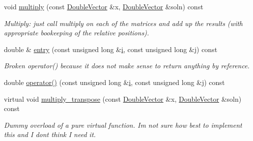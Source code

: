 \begin{DoxyCompactItemize}
void \hyperlink{classoomph_1_1SumOfMatrices_ae6c97ff92220835df3c3eeb1b0a85cc5}{multiply} (const \hyperlink{classoomph_1_1DoubleVector}{Double\+Vector} \&x, \hyperlink{classoomph_1_1DoubleVector}{Double\+Vector} \&soln) const
\begin{DoxyCompactList}\small\item\em Multiply\+: just call multiply on each of the matrices and add up the results (with appropriate bookeeping of the relative positions). \end{DoxyCompactList}\item 
double \& \hyperlink{classoomph_1_1SumOfMatrices_a848fff3077a0074c5cd33cc75913fbbd}{entry} (const unsigned long \&\hyperlink{cfortran_8h_adb50e893b86b3e55e751a42eab3cba82}{i}, const unsigned long \&j) const
\begin{DoxyCompactList}\small\item\em Broken operator() because it does not make sense to return anything by reference. \end{DoxyCompactList}\item 
double \hyperlink{classoomph_1_1SumOfMatrices_a934664ec676d36115ef27a9758827f7c}{operator()} (const unsigned long \&\hyperlink{cfortran_8h_adb50e893b86b3e55e751a42eab3cba82}{i}, const unsigned long \&j) const
\item 
virtual void \hyperlink{classoomph_1_1SumOfMatrices_a0028fb64f602aa07ff557b0a11a1c659}{multiply\+\_\+transpose} (const \hyperlink{classoomph_1_1DoubleVector}{Double\+Vector} \&x, \hyperlink{classoomph_1_1DoubleVector}{Double\+Vector} \&soln) const
\begin{DoxyCompactList}\small\item\em Dummy overload of a pure virtual function. I\textquotesingle{}m not sure how best to implement this and I don\textquotesingle{}t think I need it. \end{DoxyCompactList}\end{DoxyCompactItemize}
